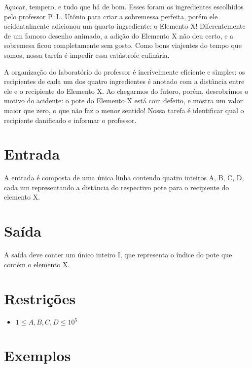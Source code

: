 Açucar, tempero, e tudo que há de bom. Esses foram os ingredientes escolhidos pelo professor P. L. Utônio para criar a sobremessa perfeita, porém ele acidentalmente adicionou um quarto ingrediente: o Elemento X! Diferentemente de um famoso desenho animado, a adição do Elemento X não deu certo, e a sobremesa ficou completamente sem gosto. Como bons viajentes do tempo que somos, nossa tarefa é impedir essa catástrofe culinária.

A organização do laboratório do professor é incrivelmente eficiente e simples: os recipientes de cada um dos quatro ingredientes é anotado com a distância entre ele e o recipiente do Elemento X. Ao chegarmos do futoro, porém, descobrimos o motivo do acidente: o pote do Elemento X está com defeito, e mostra um valor maior que zero, o que não faz o menor sentido! Nossa tarefa é identificar qual o recipiente danificado e informar o professor.

\section*{Entrada}

A entrada é composta de uma única linha contendo quatro inteiros A, B, C, D, cada um representando a distância do respectivo pote para o recipiente do elemento X.

\section*{Saída}

A saída deve conter um único inteiro I, que representa o índice do pote que contém o elemento X.

\section*{Restrições}

\begin{itemize}
\item $ 1 \leq A, B, C, D \leq 10^5$
\end{itemize}


\section*{Exemplos}

\exemplo
